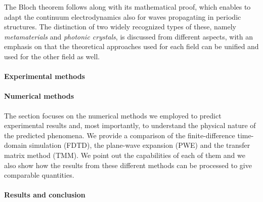 The Bloch theorem follows along with its mathematical proof, which enables to adapt the continuum electrodynamics also for waves propagating in periodic structures. 
The distinction of two widely recognized types of these, namely \textit{metamaterials} and \textit{photonic crystals}, is discussed from different aspects, with an emphasis on that the theoretical approaches used for each field can be unified and used for the other field as well.

\paragraph{Experimental methods} %



\paragraph{Numerical methods} %
The  section focuses on the numerical methods we employed to predict experimental results and, most importantly, to understand the physical nature of the predicted phenomena. We provide a comparison of the finite-difference time-domain simulation (FDTD), the plane-wave expansion (PWE) and the transfer matrix method (TMM). We point out the capabilities of each of them and we also show how the results from these different methods can be processed to give comparable quantities.

\paragraph{Results and conclusion} %

